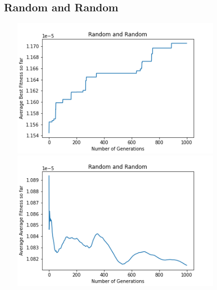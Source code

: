 \documentclass[a4paper]{article}
\begin{document}
\subsection{Random and Random}
\includegraphics[width=12cm, height=7cm]{Graphs/TSP/rand_rand_bsf.png} \\
\includegraphics[width=12cm, height=7cm]{Graphs/TSP/rand_rand_avg.png} \\
\end{document}
